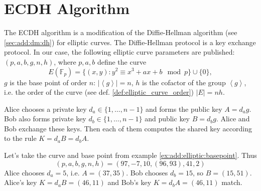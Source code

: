\section{ECDH Algorithm}

The ECDH algorithm is a modification of the Diffie-Hellman algorithm (see
\autoref{sec:add:dm:dh}) for elliptic curves. The Diffie-Hellman protocol is a key exchange protocol. In our case,
the following elliptic curve parameters are published:
$(p,a,b,g,n,h)$, where $p,a,b$ define the curve 
\[
E\left(\mathbb{F}_p\right) = \{(x,y): y^2 \equiv x^3 +a x + b \mod p
\} \cup \{0\},
\]
$g$ is the base point of order $n$: $\left|\left<g\right>\right| = n$,
$h$ is the cofactor of the group $\left<g\right>$, i.e.
the order of the curve (see
def. \ref{def:elliptic_curve_order})
$\left|E\right| = nh$.

Alice chooses a private key $d_a \in \{1, \dots, n - 1\}$ and forms
the public key $A = d_a g$. Bob also forms private key $d_b \in
\{1, \dots, n - 1\}$ and public key $B = d_b g$. Alice and Bob
exchange these keys. Then each of them computes the shared
key according to the rule $K = d_a B = d_b A$. 


\begin{example}
\label{ex:add:discretmath:ecdh}
Let's take the curve and base point from example
\ref{ex:add:elliptic:basepoint}. Thus 
\[
(p,a,b,g,n,h) = (97, -7, 10, (96,93), 41, 2)
\]
Alice chooses $d_a = 5$, i.e. 
$A = (37, 35)$. Bob chooses $d_b = 15$, so $B = (15,51)$. Alice's key
$K = d_a B = (46,11)$ and Bob's key $K = d_b A = (46,11)$
match. 
\end{example}
